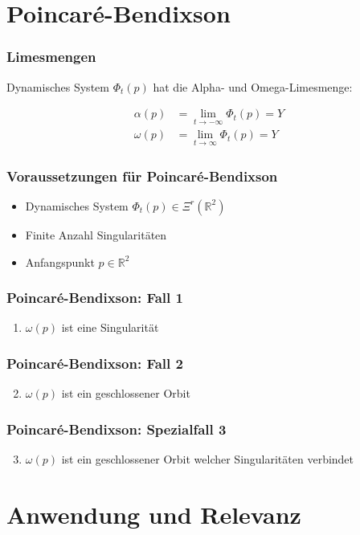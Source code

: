 \documentclass[ngerman, aspectratio=169]{beamer}
\begin{document}
	\section{Poincaré-Bendixson}
    \begin{frame}
    \frametitle{Limesmengen}
        Dynamisches System $\Phi_t(p)$ hat die Alpha- und Omega-Limesmenge:

        \begin{align*}
            \alpha(p) &= \lim_{t\to-\infty} \Phi_t(p) = Y \\
            \omega(p) &= \lim_{t\to\infty} \Phi_t(p) = Y
        \end{align*}
    \end{frame}
    \begin{frame}
    \frametitle{Voraussetzungen für Poincaré-Bendixson}
        \begin{itemize}
            \item Dynamisches System $\Phi_t(p) \in \Xi^r(\mathbb{R}^2)$
            \item Finite Anzahl Singularitäten
            \item Anfangspunkt $p \in \mathbb{R}^2$
        \end{itemize}
    \end{frame}
    \begin{frame}
    \frametitle{Poincaré-Bendixson: Fall 1}
        \begin{enumerate}
            \item $\omega(p)$ ist eine Singularität
        \end{enumerate}
    \end{frame}
    \begin{frame}
    \frametitle{Poincaré-Bendixson: Fall 2}
        \begin{enumerate}
            \setcounter{enumi}{1}
            \item $\omega(p)$ ist ein geschlossener Orbit
        \end{enumerate}
    \end{frame}
    \begin{frame}
    \frametitle{Poincaré-Bendixson: Spezialfall 3}
        \begin{enumerate}
            \setcounter{enumi}{2}
            \item $\omega(p)$ ist ein geschlossener Orbit welcher Singularitäten verbindet
        \end{enumerate}
    \end{frame}

    \section{Anwendung und Relevanz}
\end{document}

